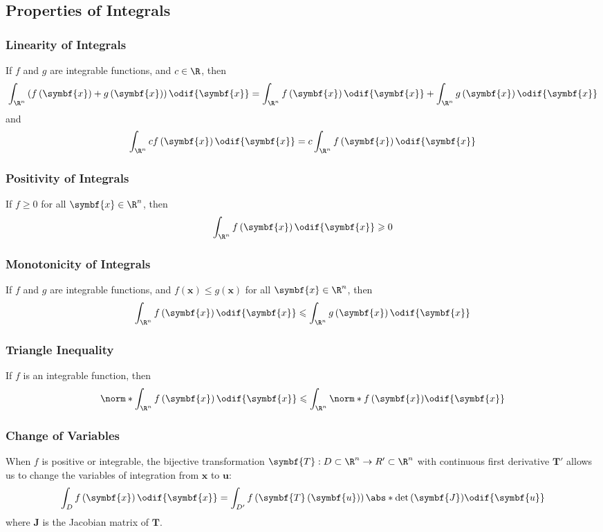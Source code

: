 \documentclass{article}
\begin{document}
\subsection{Properties of Integrals}
\subsubsection*{Linearity of Integrals}
If \(f\) and \(g\) are integrable functions, and \(c \in \R\), then
\begin{equation*}
    \int_{\R^n} \left( f\left( \symbf{x} \right) + g\left( \symbf{x} \right) \right) \odif{\symbf{x}} = \int_{\R^n} f\left( \symbf{x} \right) \odif{\symbf{x}} + \int_{\R^n} g\left( \symbf{x} \right) \odif{\symbf{x}}
\end{equation*}
and
\begin{equation*}
    \int_{\R^n} c f\left( \symbf{x} \right) \odif{\symbf{x}} = c \int_{\R^n} f\left( \symbf{x} \right) \odif{\symbf{x}}
\end{equation*}
\subsubsection*{Positivity of Integrals}
If \(f \geqslant 0\) for all \(\symbf{x} \in \R^n\), then
\begin{equation*}
    \int_{\R^n} f\left( \symbf{x} \right) \odif{\symbf{x}} \geqslant 0
\end{equation*}
\subsubsection*{Monotonicity of Integrals}
If \(f\) and \(g\) are integrable functions, and \(f\left( \symbf{x}
\right) \leqslant g\left( \symbf{x} \right)\) for all \(\symbf{x} \in
\R^n\), then
\begin{equation*}
    \int_{\R^n} f\left( \symbf{x} \right) \odif{\symbf{x}} \leqslant \int_{\R^n} g\left( \symbf{x} \right) \odif{\symbf{x}}
\end{equation*}
\subsubsection*{Triangle Inequality}
If \(f\) is an integrable function, then
\begin{equation*}
    \norm*{\int_{\R^n} f\left( \symbf{x} \right) \odif{\symbf{x}}} \leqslant \int_{\R^n} \norm*{f\left( \symbf{x} \right)} \odif{\symbf{x}}
\end{equation*}
\subsubsection*{Change of Variables}
When \(f\) is positive or integrable, the bijective transformation
\(\symbf{T} : D \subset \R^n \to R' \subset \R^n\) with continuous
first derivative \(\symbf{T}'\) allows us to change the variables of
integration from \(\symbf{x}\) to \(\symbf{u}\):
\begin{equation*}
    \int_D f\left( \symbf{x} \right) \odif{\symbf{x}} = \int_{D'} f\left( \symbf{T}\left( \symbf{u} \right) \right) \abs*{\det{\left( \symbf{J} \right)}} \odif{\symbf{u}}
\end{equation*}
where \(\symbf{J}\) is the Jacobian matrix of \(\symbf{T}\).
\end{document}
